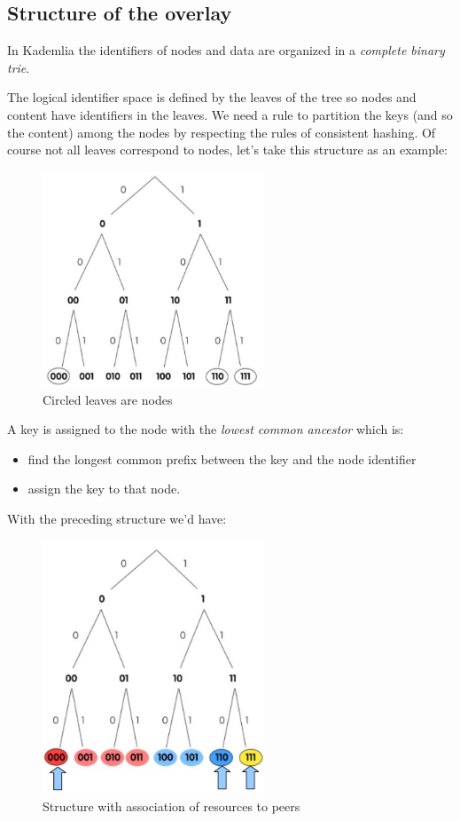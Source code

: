 \subsection{Structure of the overlay}
In Kademlia the identifiers of nodes and data are organized in a \emph{complete binary trie}.

The logical identifier space is defined by the leaves of the tree so nodes and content have identifiers in the leaves.
We need a rule to partition the keys (and so the content) among the nodes by respecting the rules of consistent hashing.
Of course not all leaves correspond to nodes, let's take this structure as an example:
\begin{figure}[H]
    \centering
    \includegraphics[width=250px]{images/3_DHT/02.png}
    \caption{Circled leaves are nodes}
\end{figure}

A key is assigned to the node with the \emph{lowest common ancestor} which is:
\begin{itemize}
    \item find the longest common prefix between the key and the node identifier
    \item assign the key to that node.
\end{itemize}
With the preceding structure we'd have:
\begin{figure}[H]
    \centering
    \includegraphics[width=250px]{images/3_DHT/03.png}
    \caption{Structure with association of resources to peers}
\end{figure}

